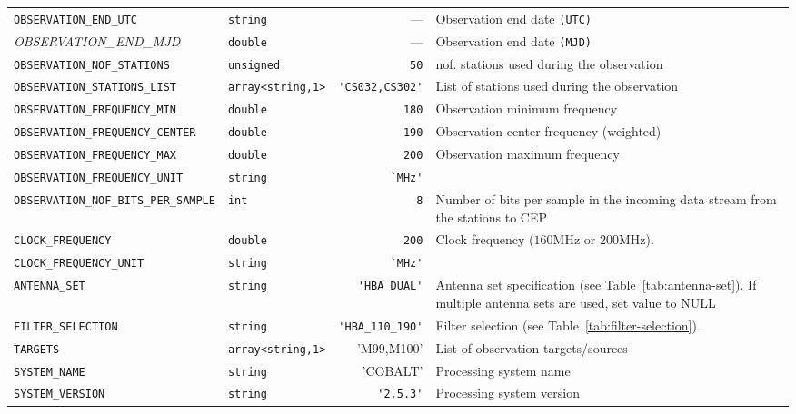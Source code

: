 \begin{table}[htbp]
\begin{tabular}{|lp{1.5cm}rp{5cm}|}
    \small{\texttt{OBSERVATION\_END\_UTC}} & \small\verb|string| & ---  & Observation end date \verb|(UTC)| \\
    \small{\textit{OBSERVATION\_END\_MJD}} & \small\verb|double| & ---  & Observation end date \verb|(MJD)| \\
    \small{\texttt{OBSERVATION\_NOF\_STATIONS}}  & \small\verb|unsigned|& \verb|50|  & nof. stations used during the observation \\
    \small{\texttt{OBSERVATION\_STATIONS\_LIST}} & \small\verb|array<string,1>| & \verb|'CS032,CS302'|  & List of stations used during the observation \\
    \small{\texttt{OBSERVATION\_FREQUENCY\_MIN}} & \small\verb|double| & \verb|180|  & Observation minimum frequency \\
    \small{\texttt{OBSERVATION\_FREQUENCY\_CENTER}} & \small\verb|double| & \verb|190|  & Observation center frequency (weighted) \\
    \small{\texttt{OBSERVATION\_FREQUENCY\_MAX}} & \small\verb|double| & \verb|200|  & Observation maximum frequency\\
    \small\verb|OBSERVATION_FREQUENCY_UNIT| & \small\verb|string| & \verb|`MHz'|  & \\
    \small\verb|OBSERVATION_NOF_BITS_PER_SAMPLE| & \small\verb|int| & \verb|8|  & Number of bits per sample in the incoming data stream from the stations to CEP \\
    \small\verb|CLOCK_FREQUENCY| & \small\verb|double| & \verb|200|  & Clock frequency ($160 \mathrm{MHz}$ or $200 \mathrm{MHz}$). \\
    \small{\verb|CLOCK_FREQUENCY_UNIT|} & \small\verb|string| & \verb|`MHz'| & \\
    \small\verb|ANTENNA_SET| & \small\verb|string| & \verb|'HBA DUAL'|  & Antenna set specification (see Table~\ref{tab:antenna-set}). If multiple antenna sets are used, set value to NULL \\
    \small \verb|FILTER_SELECTION| & \small\verb|string| & \verb|'HBA_110_190'|  & Filter selection (see Table~\ref{tab:filter-selection}).\\
    \small \verb|TARGETS| & \small\verb|array<string,1>| & 'M99,M100'  & List of observation targets/sources \\
    \small \verb|SYSTEM_NAME| & \small\verb|string| & 'COBALT'  & Processing system name \\
    \small \verb|SYSTEM_VERSION| & \small\verb|string| & \verb|'2.5.3'|  & Processing system version \\

\end{tabular}
\end{table}
